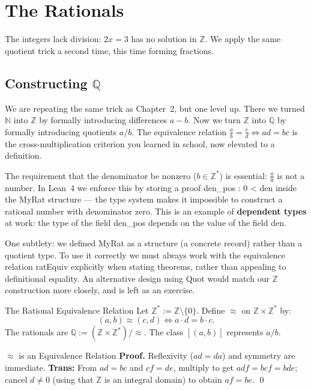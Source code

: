 \documentclass[12pt, openany]{book}
\theoremstyle{plain}
\theoremstyle{definition}
\theoremstyle{remark}
\newcommand{\N}{\mathbb{N}}
\newcommand{\Z}{\mathbb{Z}}
\newcommand{\Q}{\mathbb{Q}}
\newcommand{\li}[1]{{\ttfamily\small\color{tealaccent}#1}}
\begin{document}
\chapter{The Rationals}
\color{black}

The integers lack division: $2x = 3$ has no solution in $\Z$. We apply the same quotient trick a second time, this time forming fractions.

\section{Constructing \texorpdfstring{$\Q$}{Q}}

We are repeating the same trick as Chapter~2, but one level up.  There we turned $\N$ into $\Z$ by formally introducing differences $a - b$.  Now we turn $\Z$ into $\Q$ by formally introducing quotients $a/b$.  The equivalence relation $\frac{a}{b} = \frac{c}{d} \iff ad = bc$ is the cross-multiplication criterion you learned in school, now elevated to a definition.

The requirement that the denominator be nonzero ($b \in \Z^*$) is essential: $\frac{a}{0}$ is not a number.  In Lean~4 we enforce this by storing a proof \li{den\_pos : 0 < den} inside the \li{MyRat} structure --- the type system makes it impossible to construct a rational number with denominator zero.  This is an example of \textbf{dependent types} at work: the type of the field \li{den\_pos} depends on the value of the field \li{den}.

One subtlety: we defined \li{MyRat} as a \li{structure} (a concrete record) rather than a quotient type.  To use it correctly we must always work with the equivalence relation \li{ratEquiv} explicitly when stating theorems, rather than appealing to definitional equality.  An alternative design using \li{Quot} would match our $\Z$ construction more closely, and is left as an exercise.

\begin{defbox}{The Rational Equivalence Relation}
Let $\Z^* := \Z \setminus \{0\}$. Define $\approx$ on $\Z \times \Z^*$ by:
\[ (a, b) \approx (c, d) \iff a \cdot d = b \cdot c. \]
The rationals are $\Q := (\Z \times \Z^*)/{\approx}$. The class $[(a,b)]$ represents $a/b$.
\end{defbox}
\color{black}

\begin{thmbox}{$\approx$ is an Equivalence Relation}
\textbf{Proof.}
Reflexivity ($ad = da$) and symmetry are immediate.
\textbf{Trans:} From $ad = bc$ and $cf = de$, multiply to get $adf = bcf = bde$;
cancel $d \neq 0$ (using that $\Z$ is an integral domain) to obtain $af = be$. \qed
\end{thmbox}
\color{black}
\end{document}
